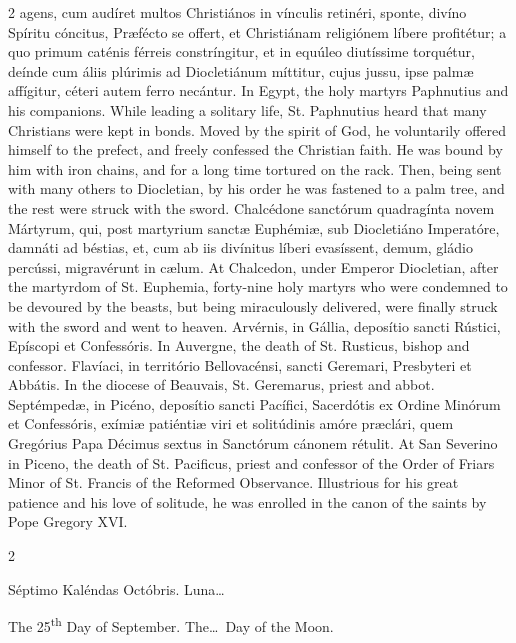 \begin{paracol}{2}
 agens, cum audíret multos Christiános in vínculis retinéri, sponte, divíno 
 Spíritu cóncitus, Præfécto se offert, et Christiánam religiónem líbere 
 profitétur; a quo primum caténis férreis constríngitur, et in equúleo 
 diutíssime torquétur, deínde cum áliis plúrimis ad Diocletiánum míttitur, 
 cujus jussu, ipse palmæ affígitur, céteri autem ferro necántur.
\switchcolumn
{}
In Egypt, the holy martyrs 
 Paphnutius and his companions. While leading a solitary life, St. 
 Paphnutius heard that many Christians were kept in bonds. Moved by the 
 spirit of God, he voluntarily offered himself to the prefect, and freely 
 confessed the Christian faith. He was bound by him with iron chains, 
 and for a long time tortured on the rack. Then, being sent with many 
 others to Diocletian, by his order he was fastened to a palm tree, and the 
 rest were struck with the sword.
\switchcolumn*
{}
Chalcédone sanctórum 
 quadragínta novem Mártyrum, qui, post martyrium sanctæ Euphémiæ, sub 
 Diocletiáno Imperatóre, damnáti ad béstias, et, cum ab iis divínitus líberi 
 evasíssent, demum, gládio percússi, migravérunt in cælum.
\switchcolumn
{}
At Chalcedon, under Emperor 
 Diocletian, after the martyrdom of St. Euphemia, forty-nine holy martyrs who 
 were condemned to be devoured by the beasts, but being miraculously 
 delivered, were finally struck with the sword and went to heaven.
\switchcolumn*
{}
Arvérnis, in Gállia, 
 deposítio sancti Rústici, Epíscopi et Confessóris.
\switchcolumn
{}
In Auvergne, the death of St. 
 Rusticus, bishop and confessor.
\switchcolumn*
{}
Flavíaci, in território Bellovacénsi, sancti Geremari, Presbyteri et Abbátis.
\switchcolumn
{}
In the diocese of Beauvais, St. 
 Geremarus, priest and abbot.
\switchcolumn*
{}
Septémpedæ, in Picéno, 
 deposítio sancti Pacífici, Sacerdótis ex Ordine Minórum et Confessóris, 
 exímiæ patiéntiæ viri et solitúdinis amóre præclári, quem Gregórius Papa 
 Décimus sextus in Sanctórum cánonem rétulit.
\switchcolumn
{}
At San Severino in Piceno, the death 
 of St. Pacificus, priest and confessor of the Order of Friars Minor of St. 
 Francis of the Reformed Observance. Illustrious for his great patience 
 and his love of solitude, he was enrolled in the canon of the saints by Pope 
 Gregory XVI.
\switchcolumn*
{}
\end{paracol}


\begin{paracol}{2}
\begin{center}{\color{gregoriocolor} Séptimo Kaléndas Octóbris. 
 Luna\dots\ }\end{center}
\switchcolumn
{}
\begin{center}{\color{gregoriocolor} The   25\textsuperscript{th} Day of 
 September. The\dots\ Day of the Moon.}\end{center}
\end{paracol}

